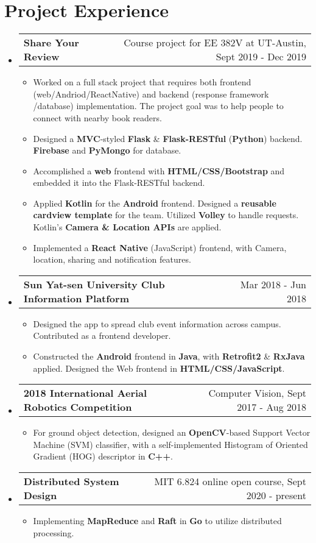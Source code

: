 \documentclass[letterpaper,11pt]{article}
\makeatletter
\newcommand{\resumeItem}[1]{
  \item\small{
    {#1 \vspace{-2pt}}
  }
}
\newcommand{\internSubheading}[2]{
	\vspace{-1pt}\item
	\begin{tabular*}{0.97\textwidth}[t]{l@{\extracolsep{\fill}}r}
		\textbf{#1} & #2 \\
	\end{tabular*}\vspace{-6.5pt}
}
\newcommand{\resumeSubHeadingListStart}{\begin{itemize}[leftmargin=*]}
\newcommand{\resumeSubHeadingListEnd}{\end{itemize}}
\newcommand{\resumeItemListStart}{\begin{itemize}}
\newcommand{\resumeItemListEnd}{\end{itemize}\vspace{-5pt}}
\makeatother
\begin{document}
\section{Project Experience}
	\resumeSubHeadingListStart
	\internSubheading
	{Share Your Review}{Course project for EE 382V at UT-Austin, Sept 2019 - Dec 2019}
	\resumeItemListStart
	\resumeItem
	{Worked on a full stack project that requires both frontend (web/Andriod/ReactNative) and backend (response framework /database) implementation. The project goal was to help people to connect with nearby book readers.}
	\resumeItem
	{Designed a \textbf{MVC}-styled \textbf{Flask} \& \textbf{Flask-RESTful} (\textbf{Python}) backend. \textbf{Firebase} and \textbf{PyMongo} for database. }
	\resumeItem
	{Accomplished a \textbf{web} frontend with \textbf{HTML/CSS/Bootstrap} and embedded it into the Flask-RESTful backend.}
	\resumeItem
	{Applied \textbf{Kotlin} for the \textbf{Android} frontend. Designed a \textbf{reusable cardview template} for the team. Utilized \textbf{Volley} to handle requests. Kotlin's \textbf{Camera \& Location APIs} are applied.  }
	\resumeItem
	{Implemented a \textbf{React Native} (JavaScript) frontend, with Camera, location, sharing and notification features. }
	\resumeItemListEnd
	
	\internSubheading{Sun Yat-sen University Club Information Platform}{Mar 2018 - Jun 2018}
	\resumeItemListStart
	\resumeItem{Designed the app to spread club event information across campus. Contributed as a frontend developer.}
	\resumeItem{Constructed the \textbf{Android} frontend in \textbf{Java}, with \textbf{Retrofit2} \& \textbf{RxJava} applied. Designed the Web frontend in \textbf{HTML/CSS/JavaScript}. }		
	\resumeItemListEnd
	\internSubheading{2018 International Aerial Robotics Competition}{Computer Vision, Sept 2017 - Aug 2018}
	\resumeItemListStart
	\resumeItem{For ground object detection, designed an \textbf{OpenCV}-based Support Vector Machine (SVM) classifier, with a self-implemented Histogram of Oriented Gradient (HOG) descriptor in \textbf{C++}. }
	\resumeItemListEnd
	\internSubheading{Distributed System Design}{MIT 6.824 online open course, Sept 2020 - present}
	\resumeItemListStart
	\resumeItem{Implementing \textbf{MapReduce} and \textbf{Raft} in \textbf{Go} to utilize distributed processing.  }		
	\resumeItemListEnd	  
  \resumeSubHeadingListEnd
  
\end{document}
